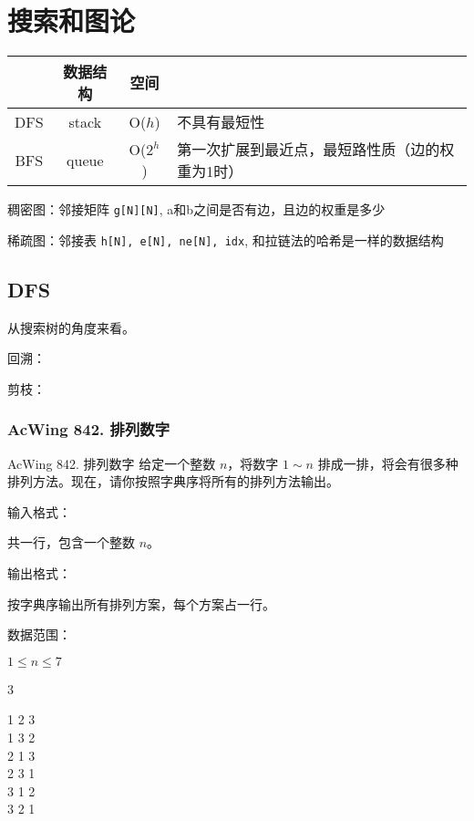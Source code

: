 \chapter{搜索和图论}

\begin{table}[!ht]
    \centering
    \begin{tabular}{|c|c|c|l|}
    \hline
        ~ & 数据结构 & 空间 & ~ \\ \hline
        DFS & stack & O($h$) & 不具有最短性 \\ \hline
        BFS & queue & O($2^h$) & 第一次扩展到最近点，最短路性质（边的权重为1时） \\ \hline
    \end{tabular}
\end{table}


稠密图：邻接矩阵 \lstinline{g[N][N]}, a和b之间是否有边，且边的权重是多少

稀疏图：邻接表 \lstinline{h[N], e[N], ne[N], idx}, 和拉链法的哈希是一样的数据结构

\section{DFS}
从搜索树的角度来看。

回溯：

剪枝：

\subsection{AcWing 842. 排列数字}
\begin{titledbox}{AcWing 842. 排列数字}
给定一个整数 $n$，将数字 $1 \sim n$ 排成一排，将会有很多种排列方法。现在，请你按照字典序将所有的排列方法输出。

输入格式：

共一行，包含一个整数 $n$。

输出格式：

按字典序输出所有排列方案，每个方案占一行。

数据范围：

$1 \le n \le 7$

\begin{inputblock}
    3
\end{inputblock}
\begin{outputblock}
    1 2 3 \\
    1 3 2 \\
    2 1 3 \\
    2 3 1 \\
    3 1 2 \\
    3 2 1
\end{outputblock}
\end{titledbox}


